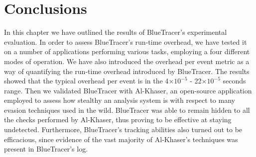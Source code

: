 \iffalse
\section{JoeBox}
\fi

\section{Conclusions}
In this chapter we have outlined the results of BlueTracer's experimental evaluation. In order to assess BlueTracer's run-time overhead, we have tested it on a number of applications performing various tasks, employing a four different modes of operation. We have also introduced the overhead per event metric as a way of quantifying the run-time overhead introduced by BlueTracer. The results showed that the typical overhead per event is in the 4$\times10^{-5}$ - 22$\times10^{-5}$ seconds range.
Then we validated BlueTracer with Al-Khaser, an open-source application employed to assess how stealthy an analysis system is with respect to many evasion techniques used in the wild. BlueTracer was able to remain hidden to all the checks performed by Al-Khaser, thus proving to be effective at staying undetected. Furthermore, BlueTracer's tracking abilities also turned out to be efficacious, since evidence of the vast majority of Al-Khaser's techniques was present in BlueTracer's log.